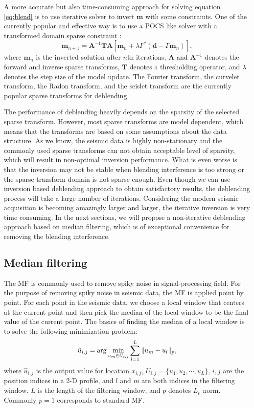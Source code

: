 A more accurate but also time-consuming approach for solving equation \ref{eq:blend} is to use iterative solver to invert $\mathbf{m}$ with some constraints. One of the currently popular and effective way is to use a POCS like solver with a transformed domain sparse constraint \cite[]{abma2010,yangkang20142}:
\begin{equation}
\label{eq:pocs}
\mathbf{m}_{n+1}=\mathbf{A}^{-1}\mathbf{T}\mathbf{A}[\mathbf{m}_n+\lambda\Gamma^*(\mathbf{d}-\Gamma\mathbf{m}_n)],
\end{equation}
where $\mathbf{m}_{n}$ is the inverted solution after $n$th iterations, $\mathbf{A}$ and $\mathbf{A}^{-1}$ denotes the forward and inverse sparse transforms, $\mathbf{T}$ denotes a thresholding operator, and $\lambda$ denotes the step size of the model update. The Fourier transform, the curvelet transform, the Radon transform, and the seislet transform are the currently popular sparse transforms for deblending.

The performance of deblending heavily depends on the sparsity of the selected sparse transform. However, most sparse transforms are model dependent, which means that the transforms are based on some assumptions about the data structure. As we know, the seismic data is highly non-stationary and the commonly used sparse transforms can not obtain acceptable level of sparsity, which will result in non-optimal inversion performance. What is even worse is that the inversion may not be stable when blending interference is too strong or the sparse transform domain is not sparse enough. Even though we can use inversion based deblending approach to obtain satisfactory results, the deblending process will take a large number of iterations. Considering the modern seismic acquisition is becoming amazingly larger and larger, the iterative inversion is very time consuming. In the next sections, we will propose a non-iterative deblending approach based on median filtering, which is of exceptional convenience for removing the blending interference.

\subsection{Median filtering}
The MF is commonly used to remove spiky noise in signal-processing field. For the purpose of removing spiky noise in seismic data, the MF is applied point by point. For each point in the seismic data, we choose a local window that centers at the current point and then pick the median of the local window to be the final value of the current point. The basics of finding the median of a local window is to solve the following minimization problem:
\begin{equation}
\label{eq:mf1}
\hat{u}_{i,j}=\arg\min_{u_m\in U_{i,j}}\sum_{l=1}^{L}\Arrowvert u_m-u_l \Arrowvert_p,
\end{equation}
where $\hat{u}_{i,j}$ is the output value for location $x_{i,j}$, $U_{i,j}=\{u_1,u_2,\cdots,u_L\}$, $i,j$ are the position indices in a 2-D profile, and $l$ and $m$ are both indices in the filtering window. $L$ is the length of the filtering window, and $p$ denotes $L_p$ norm. Commonly $p=1$ corresponds to standard MF. 

